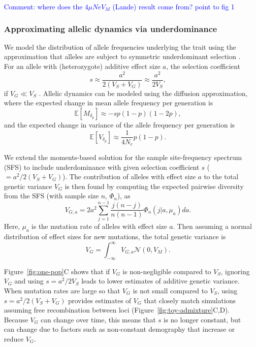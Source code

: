 \documentclass{article}
\newcommand{\aprcomment}[1]{{\textcolor{blue}{Comment: #1}}}
\newcommand{\E}{\mathbb{E}}
\begin{document}
\aprcomment{where does the $4\mu Ne V_M$ (Lande) result come from? point to fig 1}

\subsubsection*{Approximating allelic dynamics via underdominance}

We model the distribution of allele frequencies underlying the trait using
the approximation that alleles are subject to symmetric underdominant
selection \citep{robertson1956effect,keightley1988quantitative}.
For an allele with (heterozygote) additive effect size $a$,
the selection coefficient
\[s\approx \frac{a^2}{2(V_S + V_G)} \approx \frac{a^2}{2V_S},\]
if $V_G \ll V_S$ \citep[e.g.,][]{simons2018population}. Allelic dynamics can
be modeled using the diffusion approximation, where the expected change
in mean allele frequency per generation is
\[\E[M_{\delta_p}] \approx -s p(1-p)(1-2p),\]
and the expected change in variance of the allele frequency per generation is
\[\E[V_{\delta_p}] \approx \frac{1}{4N_e}p(1-p).\]

We extend the moments-based solution for the sample site-frequency spectrum
(SFS) \citep{jouganous2017inferring} to include underdominance with given
selection coefficient $s$ (\(=a^2/2(V_S+V_G)\)). The contribution of alleles
with effect size $a$ to the total genetic variance $V_G$ is then found by
computing the expected pairwise diversity from the SFS (with sample size $n$,
$\Phi_n$), as
\[V_{G,a} = 2a^2\sum_{j=1}^{n-1}\frac{j(n-j)}{n(n-1)}\Phi_n(j|a,\mu_a)da.\]
Here, $\mu_a$ is the mutation rate of alleles with effect size $a$. Then
assuming a normal distribution of effect sizes for new mutations, the total
genetic variance is
\[V_G=\int_{-\infty}^\infty V_{G,a}\mathcal{N}(0,V_M).\]

Figure~\ref{fig:one-pop}C shows that if $V_G$ is non-negligible compared to
$V_S$, ignoring $V_G$ and using $s=a^2/2V_S$ leads to lower estimates of
additive genetic variance. When mutation rates are large so that $V_G$ is not
small compared to $V_S$, using $s=a^2/2(V_S+V_G)$ provides estimates of $V_G$
that closely match simulations assuming free recombination between loci
(Figure~\ref{fig:toy-admixture}C,D). Because $V_G$ can change over time, this
means that $s$ is no longer constant, but can change due to factors such as
non-constant demography that increase or reduce $V_G$.
\end{document}
